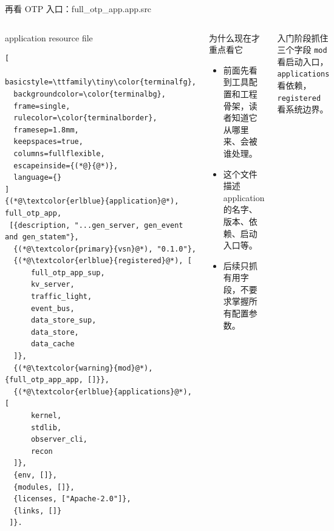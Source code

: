 \documentclass[aspectratio=169, 9pt]{beamer}
\newcommand{\code}[1]{\texttt{#1}}
\begin{document}
\begin{frame}[fragile]{再看 OTP 入口：full\_otp\_app.app.src}
  \begin{columns}[T,onlytextwidth]
    \begin{block}{application resource file}
\begin{lstlisting}[
  basicstyle=\ttfamily\tiny\color{terminalfg},
  backgroundcolor=\color{terminalbg},
  frame=single,
  rulecolor=\color{terminalborder},
  framesep=1.8mm,
  keepspaces=true,
  columns=fullflexible,
  escapeinside={(*@}{@*)},
  language={}
]
{(*@\textcolor{erlblue}{application}@*), full_otp_app,
 [{description, "...gen_server, gen_event and gen_statem"},
  {(*@\textcolor{primary}{vsn}@*), "0.1.0"},
  {(*@\textcolor{erlblue}{registered}@*), [
      full_otp_app_sup,
      kv_server,
      traffic_light,
      event_bus,
      data_store_sup,
      data_store,
      data_cache
  ]},
  {(*@\textcolor{warning}{mod}@*), {full_otp_app_app, []}},
  {(*@\textcolor{erlblue}{applications}@*), [
      kernel,
      stdlib,
      observer_cli,
      recon
  ]},
  {env, []},
  {modules, []},
  {licenses, ["Apache-2.0"]},
  {links, []}
 ]}.
\end{lstlisting}
    \end{block}
    \footnotesize
    \begin{block}{为什么现在才重点看它}
      \begin{itemize}
        \item 前面先看到工具配置和工程骨架，读者知道它从哪里来、会被谁处理。
        \item 这个文件描述 application 的名字、版本、依赖、启动入口等。
        \item 后续只抓有用字段，不要求掌握所有配置参数。
      \end{itemize}
    \end{block}
    \vspace{0.15cm}
    \begin{alertblock}{入门阶段抓住三个字段}
      \code{mod} 看启动入口，\code{applications} 看依赖，\code{registered} 看系统边界。
    \end{alertblock}
  \end{columns}
\end{frame}
\end{document}
